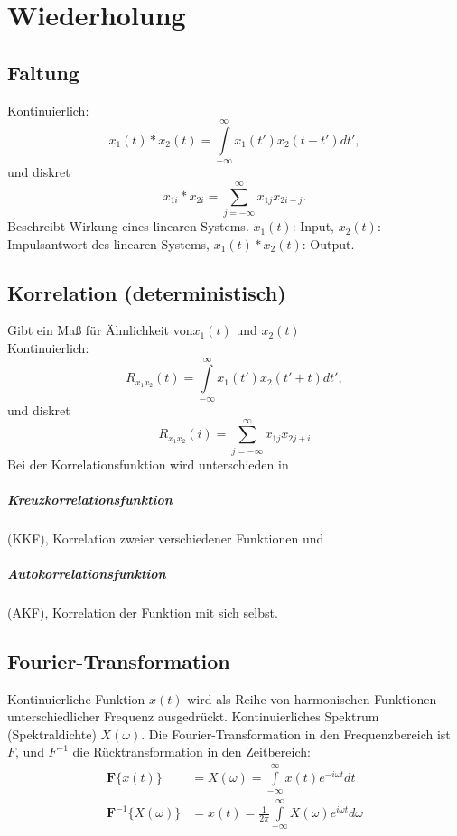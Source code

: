 \chapter{Wiederholung}

\section{Faltung}
Kontinuierlich: 
\begin{equation}
x_1(t) \ast x_2(t)= \int\limits_{-\infty}^{\infty} x_1(t')x_2(t-t')dt',
\end{equation}
und diskret
\begin{equation}
x_{1i} \ast x_{2i} = \sum\limits_{j=-\infty}^{\infty} x_{1j} x_{2i-j}.
\end{equation}
Beschreibt Wirkung eines linearen Systems. $x_1(t)$: Input, $x_2(t)$: Impulsantwort des linearen Systems, $x_1(t) \ast x_2(t)$: Output.


\section{Korrelation (deterministisch)}
Gibt ein Maß für Ähnlichkeit von$ x_1(t)$ und $x_2(t)$\\
Kontinuierlich:
\begin{equation}
R_{x_1x_2}(t)= \int\limits_{-\infty}^{\infty} x_1(t')x_2(t'+t)dt',
\end{equation}
und diskret
\begin{equation}
R_{x_1x_2}(i) = \sum\limits_{j=-\infty}^{\infty} x_{1j} x_{2j+i}
\end{equation}
Bei der Korrelationsfunktion wird unterschieden in
\paragraph*{Kreuzkorrelationsfunktion} (KKF), Korrelation zweier verschiedener Funktionen und
\paragraph*{Autokorrelationsfunktion} (AKF), Korrelation der Funktion mit sich selbst.

\section{Fourier-Transformation}
Kontinuierliche Funktion $x(t)$ wird als Reihe von harmonischen Funktionen unterschiedlicher Frequenz ausgedrückt. Kontinuierliches Spektrum (Spektraldichte) $X(\omega)$. Die Fourier-Transformation in den Frequenzbereich ist $F$, und $F^{-1}$ die Rücktransformation in den Zeitbereich:
\begin{align}
\textbf{F}\{x(t)\}  & = X(\omega) =\int\limits_{-\infty}^{\infty} x(t) e^{-i\omega t}dt\\
\textbf{F}^{-1}\{X(\omega)\} & = x(t) =\frac {1}{2\pi}\int\limits_{-\infty}^{\infty} X(\omega) e^{i\omega t}d\omega
\end{align}

